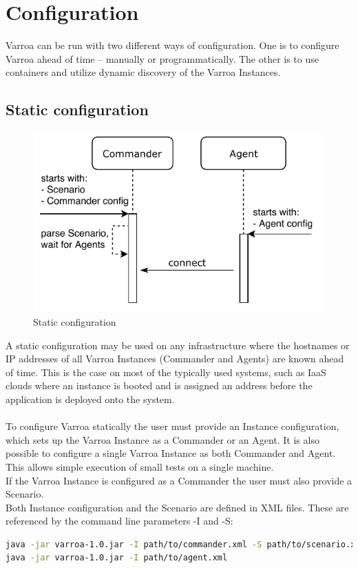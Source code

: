 \section{Configuration}
Varroa can be run with two different ways of configuration.
One is to configure Varroa ahead of time -- manually or programmatically.
The other is to use containers and utilize dynamic discovery of the Varroa Instances.

\subsection{Static configuration}
\begin{figure}[h]
\begin{center}
\includegraphics[scale=1]{Resources/PDF/ExecutionStaticInit}
\caption{Static configuration}
\label{pic:staticExecution}
\end{center}
\end{figure}

A static configuration may be used on any infrastructure where the hostnames or IP addresses of all Varroa Instances (Commander and Agents) are known ahead of time. This is the case on most of the typically used systems, such as IaaS clouds where an instance is booted and is assigned an address before the application is deployed onto the system.\\
\\
To configure Varroa statically the user must provide an Instance configuration, which sets up the Varroa Instance as a Commander or an Agent.
It is also possible to configure a single Varroa Instance as both Commander and Agent.
This allows simple execution of small tests on a single machine.
\\
If the Varroa Instance is configured as a Commander the user must also provide a Scenario.
\\
Both Instance configuration and the Scenario are defined in XML files.
These are referenced by the command line parameters -I and -S:
\begin{lstlisting}[caption={Command line configuration examples}, captionpos=b, label={lst:commanderConfig}, language=bash]
java -jar varroa-1.0.jar -I path/to/commander.xml -S path/to/scenario.xml
java -jar varroa-1.0.jar -I path/to/agent.xml
\end{lstlisting}

